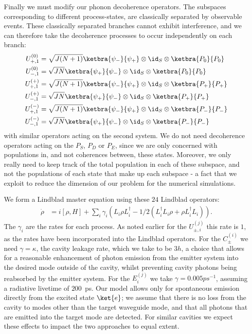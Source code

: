 Finally we must modify our phonon decoherence operators. The subspaces corresponding to different process-states, are classically separated by observable events. These classically separated branches cannot exhibit interference, and we can therefore take the decoherence processes to occur independently on each branch:
\begin{eqnarray}
  U_{+,1}^{(0)} &= \sqrt{J(N+1)}\ketbra{\psi_-}{\psi_+} \otimes \id_S \otimes \ketbra{P_0}{P_0}\\
  U_{-,1}^{(0)} &= \sqrt{JN}\ketbra{\psi_+}{\psi_-} \otimes \id_S \otimes \ketbra{P_0}{P_0}\\
  U_{+,1}^{(+)} &= \sqrt{J(N+1)}\ketbra{\psi_-}{\psi_+} \otimes \id_S \otimes \ketbra{P_+}{P_+}\\
  U_{-,1}^{(+)} &= \sqrt{JN}\ketbra{\psi_+}{\psi_-} \otimes \id_S \otimes \ketbra{P_+}{P_+}\\
  U_{+,1}^{(-)} &= \sqrt{J(N+1)}\ketbra{\psi_-}{\psi_+} \otimes \id_S \otimes \ketbra{P_-}{P_-}\\
  U_{-,1}^{(-)} &= \sqrt{JN}\ketbra{\psi_+}{\psi_-} \otimes \id_S \otimes \ketbra{P_-}{P_-}
\end{eqnarray}  
with similar operators acting on the second system. We do not need decoherence operators acting on the $P_S$, $P_D$ or $P_E$, since we are only concerned with populations in, and not coherences between, these states. Moreover, we only really need to keep track of the total population in each of these subspace, and not the populations of each state that make up each subspace - a fact that we exploit to reduce the dimension of our problem for the numerical simulations.

We form a Lindblad master equation using these $24$ Lindblad operators:
\begin{eqnarray}
  \dot{\rho} &= i\left[ \rho, H \right] + \sum_i \gamma_i \left( L_i\rho L_i^\dagger - 1/2(L_i^\dagger L_i\rho + \rho L_i^\dagger L_i) \right).
\end{eqnarray}
The $\gamma_i$ are the rates for each process. As noted earlier for the $U_{\pm, i}^{(j)}$ this rate is $1$, as the rates have been incorporated into the Lindblad operators. For the $C_\pm^{(i)}$ we need $\gamma = \kappa$, the cavity leakage rate, which we take to be $3h$, a choice that allows for a reasonable enhancement of photon emission from the emitter system into the desired mode outside of the cavity, whilst preventing cavity photons being reabsorbed by the emitter system. For the $E_i^{(j)}$ we take $\gamma = 0.005ps^{-1}$, assuming a radiative livetime of $200$~ps. Our model allows only for spontaneous emission directly from the excited state $\ket{e}$; we assume that there is no loss from the cavity to modes other than the target waveguide mode, and that all photons that are emitted into the target mode are detected. For similar cavities we expect these effects to impact the two approaches to equal extent. 

